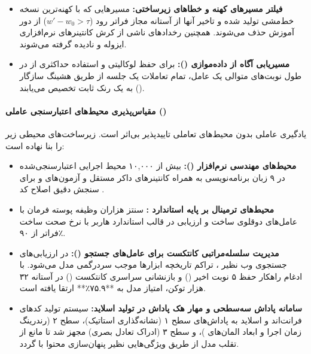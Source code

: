 \begin{itemize}
\begin{equation}
    \end{equation}
    اگر نسبت $r_t(\theta)$ از بازه اطمینان خارج شود، گرادیان آن توکن صفر می‌شود که پایداری بی‌نظیری را در مقابل خط‌مشی‌های بسیار کهنه پدید می‌آورد.
    \item \textbf{فیلتر مسیرهای کهنه و خطاهای زیرساختی:} مسیرهایی که با کهنه‌ترین نسخه خط‌مشی تولید شده و تاخیر آنها از آستانه مجاز فراتر رود ($w' - w_0 > \tau$) از دور آموزش حذف می‌شوند. همچنین رخدادهای ناشی از کرش کانتینرهای نرم‌افزاری ایزوله و نادیده گرفته می‌شوند.
    \item \textbf{مسیریابی آگاه از داده‌موازی ():} برای حفظ لوکالیتی و استفاده حداکثری از  در طول نوبت‌های متوالی یک عامل، تمام تعاملات یک جلسه از طریق هشینگ سازگار () به یک رنک ثابت  تخصیص می‌یابند.
\end{itemize}

\paragraph*{مقیاس‌پذیری محیط‌های اعتبارسنجی عاملی ()}
یادگیری عاملی بدون محیط‌های تعاملی تاییدپذیر بی‌اثر است.  زیرساخت‌های محیطی زیر را بنا نهاده است:
\begin{itemize}
    \item \textbf{محیط‌های مهندسی نرم‌افزار ():} بیش از ۱۰,۰۰۰ محیط اجرایی اعتبارسنجی‌شده در ۹ زبان برنامه‌نویسی به همراه کانتینرهای داکر مستقل و آزمون‌های  و  برای سنجش دقیق اصلاح کد \cite{zhang2025repolaunch}.
    \item \textbf{محیط‌های ترمینال بر پایه استاندارد :} سنتز هزاران وظیفه پوسته فرمان با عامل‌های دوقلوی ساخت و ارزیابی در قالب استاندارد هاربر \cite{harbor2026team} با نرخ صحت ساخت فراتر از ۹۰٪.
    \item \textbf{مدیریت سلسله‌مراتبی کانتکست برای عامل‌های جستجو ():} در ارزیابی‌های جستجوی وب نظیر  \cite{wei2025browsecomp}، تراکم تاریخچه ابزارها موجب سردرگمی مدل می‌شود. با ادغام راهکار حفظ ۵ نوبت اخیر () و بازنشانی سراسری کانتکست () در آستانه ۳۲ هزار توکن، امتیاز مدل به **۷۵.۹٪** ارتقا یافته است.
    \item \textbf{سامانه پاداش سه‌سطحی و مهار هک پاداش در تولید اسلاید:} سیستم تولید کدهای فرانت‌اند و اسلاید به پاداش‌های سطح ۱ (نشانه‌گذاری استاتیک)، سطح ۲ (رندرینگ زمان اجرا و ابعاد المان‌های )، و سطح ۳ (ادراک تعادل بصری) مجهز شد تا مانع از تقلب مدل از طریق ویژگی‌هایی نظیر پنهان‌سازی محتوا با  گردد.
\end{itemize}

